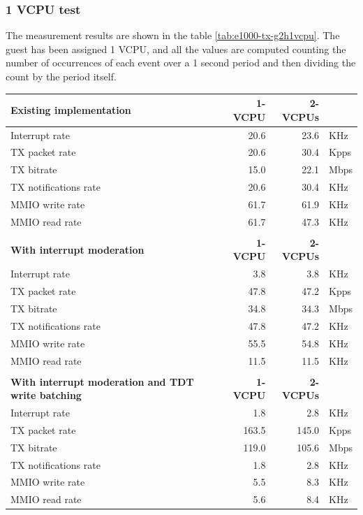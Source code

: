 \subsubsection{1 VCPU test}
\label{sec:e1000-tx-g2h1vcpu}
The measurement results are shown in the table \ref{tab:e1000-tx-g2h1vcpu}. The guest has been assigned 1 VCPU, and all the values are
computed counting the number of occurrences of each event over a 1 second period and then dividing the count by the period itself.

\begin{table}
\begin{center}
\begin{tabular}{lrrl}
\toprule
\textbf{Existing implementation} & \textbf{1-VCPU} & \textbf{2-VCPUs} & \\
\midrule
Interrupt rate & 20.6 & 23.6 & KHz\\
TX packet rate & 20.6 & 30.4& Kpps\\
TX bitrate & 15.0 & 22.1 & Mbps\\
TX notifications rate & 20.6 & 30.4& KHz\\
MMIO write rate & 61.7 & 61.9& KHz\\
MMIO read rate & 61.7 & 47.3 & KHz\\
\bottomrule
&&\\
\toprule
\textbf{With interrupt moderation} & \textbf{1-VCPU} & \textbf{2-VCPUs} &\\
\midrule
Interrupt rate & 3.8 & 3.8 & KHz\\
TX packet rate & 47.8 & 47.2 & Kpps\\
TX bitrate & 34.8 & 34.3 & Mbps\\
TX notifications rate & 47.8 & 47.2 & KHz\\
MMIO write rate & 55.5 & 54.8 & KHz\\
MMIO read rate & 11.5 & 11.5 & KHz\\
\bottomrule
&&\\
\toprule
\textbf{With interrupt moderation and TDT write batching} & \textbf{1-VCPU} & \textbf{2-VCPUs} &\\
\midrule
Interrupt rate & 1.8 & 2.8 & KHz\\
TX packet rate & 163.5 & 145.0 & Kpps\\
TX bitrate & 119.0 & 105.6 & Mbps\\
TX notifications rate & 1.8 & 2.8 & KHz\\
MMIO write rate & 5.5 & 8.3 & KHz\\
MMIO read rate & 5.6 & 8.4 & KHz\\

\end{tabular}
\end{center}
\end{table}
